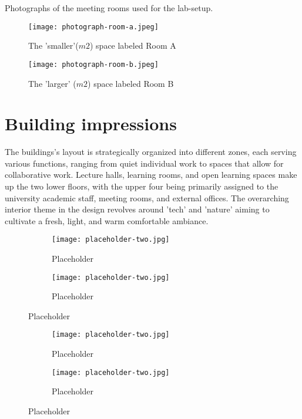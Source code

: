 \begin{appendices}
Photographs of the meeting rooms used for the lab-setup.

\begin{figure}[H]
\begin{minipage}{.5\textwidth}
    \centering
    \texttt{[image: photograph-room-a.jpeg]}
    \caption{The 'smaller'($m2$) space labeled Room A}
    \label{fig:timeline}
\end{minipage}%
\begin{minipage}{.5\textwidth}
    \centering
    \texttt{[image: photograph-room-b.jpeg]}
    \caption{The 'larger' ($m2$) space labeled Room B}
    \label{fig:timeline}
\end{minipage}%
\end{figure}

\section{Building impressions}
\label{appendix:building}

The buildings's layout is strategically organized into different zones, each serving various functions, ranging from quiet individual work to spaces that allow for collaborative work. Lecture halls, learning rooms, and open learning spaces make up the two lower floors, with the upper four being primarily assigned to the university academic staff, meeting rooms, and external offices. The overarching interior theme in the design revolves around 'tech' and 'nature' aiming to cultivate a fresh, light, and warm comfortable ambiance. 

\begin{figure}[htbp]
    \centering
    \begin{subfigure}{0.48\textwidth}
        \centering
        \texttt{[image: placeholder-two.jpg]}
        \caption{Placeholder}
        \label{fig:image1}
    \end{subfigure}
    \hfill
    \begin{subfigure}{0.48\textwidth}
        \centering
        \texttt{[image: placeholder-two.jpg]}
        \caption{Placeholder}
        \label{fig:image2}
    \end{subfigure}
    \caption{Placeholder}
    \label{fig:grid}
\end{figure}

\begin{figure}[htbp]
    \centering
    \begin{subfigure}{0.48\textwidth}
        \centering
        \texttt{[image: placeholder-two.jpg]}
        \caption{Placeholder}
        \label{fig:image1}
    \end{subfigure}
    \hfill
    \begin{subfigure}{0.48\textwidth}
        \centering
        \texttt{[image: placeholder-two.jpg]}
        \caption{Placeholder}
        \label{fig:image2}
    \end{subfigure}
    \caption{Placeholder}
    \label{fig:grid}
\end{figure}


\end{appendices}
